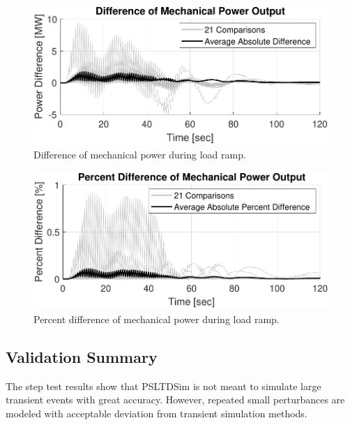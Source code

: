 \begin{figure}[!ht]
	\centering
	\includegraphics[width=\linewidth]{figures/miniWECC3ALTDrampPm2}
	\caption{Difference of mechanical power during load ramp.}
	\label{fig: rampPmdif}
\end{figure}

\begin{figure}[!ht]
	\centering
	\includegraphics[width=\linewidth]{figures/miniWECC3ALTDrampPm3}
	\caption{Percent difference of mechanical power during load ramp.}
	\label{fig: rampPmPercentdif}
\end{figure}
\subsection{Validation Summary}
The step test results show that PSLTDSim is not meant to simulate large transient events with great accuracy.
However, repeated small perturbances are modeled with acceptable deviation from transient simulation methods.